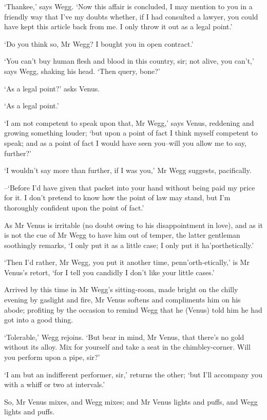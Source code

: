 ‘Thankee,’ says Wegg. ‘Now this affair is concluded, I may mention to
you in a friendly way that I’ve my doubts whether, if I had consulted a
lawyer, you could have kept this article back from me. I only throw it
out as a legal point.’

‘Do you think so, Mr Wegg? I bought you in open contract.’

‘You can’t buy human flesh and blood in this country, sir; not alive,
you can’t,’ says Wegg, shaking his head. ‘Then query, bone?’

‘As a legal point?’ asks Venus.

‘As a legal point.’

‘I am not competent to speak upon that, Mr Wegg,’ says Venus, reddening
and growing something louder; ‘but upon a point of fact I think myself
competent to speak; and as a point of fact I would have seen you--will
you allow me to say, further?’

‘I wouldn’t say more than further, if I was you,’ Mr Wegg suggests,
pacifically.

--‘Before I’d have given that packet into your hand without being paid
my price for it. I don’t pretend to know how the point of law may stand,
but I’m thoroughly confident upon the point of fact.’

As Mr Venus is irritable (no doubt owing to his disappointment in love),
and as it is not the cue of Mr Wegg to have him out of temper, the
latter gentleman soothingly remarks, ‘I only put it as a little case; I
only put it ha’porthetically.’

‘Then I’d rather, Mr Wegg, you put it another time, penn’orth-etically,’
is Mr Venus’s retort, ‘for I tell you candidly I don’t like your little
cases.’

Arrived by this time in Mr Wegg’s sitting-room, made bright on the
chilly evening by gaslight and fire, Mr Venus softens and compliments
him on his abode; profiting by the occasion to remind Wegg that he
(Venus) told him he had got into a good thing.

‘Tolerable,’ Wegg rejoins. ‘But bear in mind, Mr Venus, that there’s
no gold without its alloy. Mix for yourself and take a seat in the
chimbley-corner. Will you perform upon a pipe, sir?’

‘I am but an indifferent performer, sir,’ returns the other; ‘but I’ll
accompany you with a whiff or two at intervals.’

So, Mr Venus mixes, and Wegg mixes; and Mr Venus lights and puffs, and
Wegg lights and puffs.

